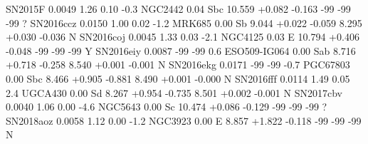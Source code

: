 SN2015F          0.0049   1.26 0.10     -0.3    NGC2442        0.04                  Sbc    10.559 +0.082 -0.163     -99  -99 -99  ?
SN2016ccz        0.0150   1.00 0.02     -1.2    MRK685         0.00                  Sb     9.044 +0.022 -0.059       8.295 +0.030 -0.036     N 
SN2016coj        0.0045   1.33 0.03     -2.1    NGC4125        0.03                  E      10.794 +0.406 -0.048     -99 -99 -99    Y 
SN2016eiy        0.0087   -99 -99     0.6     ESO509-IG064   0.00 Sab    8.716 +0.718 -0.258       8.540 +0.001 -0.001     N 
SN2016ekg        0.0171   -99 -99     -0.7    PGC67803       0.00 Sbc    8.466 +0.905 -0.881       8.490 +0.001 -0.000     N 
SN2016fff        0.0114   1.49 0.05     2.4     UGCA430        0.00                  Sd     8.267 +0.954 -0.735       8.501 +0.002 -0.001     N 
SN2017cbv        0.0040   1.06 0.00     -4.6    NGC5643        0.00                  Sc     10.474 +0.086 -0.129     -99 -99 -99   ? 
SN2018aoz        0.0058   1.12 0.00     -1.2     NGC3923       0.00                  E      8.857 +1.822 -0.118      -99 -99 -99   N 
